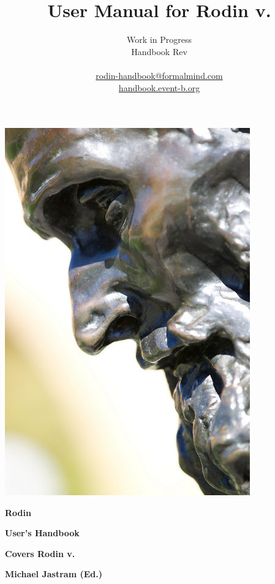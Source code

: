 \documentclass[12pt]{book}
\title{User Manual for Rodin v.\versionnr}
\author{
Work in Progress\\
Handbook $ $Rev$ $ \\
\\
\href{mailto:rodin-handbook@formalmind.com}{rodin-handbook@formalmind.com}\\
\href{http://handbook.event-b.org}{handbook.event-b.org}
}
\begin{document}
        

\ifplastex
\maketitle
\begin{center}
\includegraphics{img/rodin_miikka_skaffari_small.jpg}
\end{center}
\else
\begin{titlepage}
\AddToShipoutPicture*{\BackgroundPic}
\vspace*{14.5cm}
{ \fontsize{70}\selectfont \bfseries Rodin}

\vspace*{0.5cm}
{ \fontsize{24.5}\selectfont \bfseries User's Handbook}

\vspace*{1cm}
{ \fontsize{16}\selectfont \bfseries Covers Rodin v.\versionnr}

\vspace*{2cm}
{ \fontsize{16}\selectfont \bfseries Michael Jastram (Ed.)}

\end{titlepage}
\tableofcontents
\fi
\end{document}
